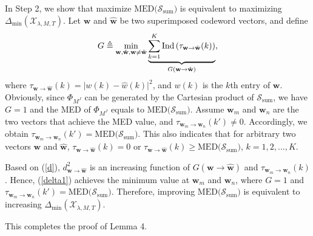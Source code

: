 \documentclass[journal]{IEEEtran}
\begin{document}
 In Step 2,  we show that maximize   $\text{MED} \big ({\boldsymbol{\mathcal S}_{\text{sum}} } \big) $ is equivalent to maximizing    $\Delta_{\min}\left( {   \boldsymbol {\mathcal X}_{\lambda,M,T}      }\right) $.  Let ${{\mathbf{w}} }$ and ${ \hat{\mathbf{w}} }$    be   two superimposed codeword vectors, and define   \begin{equation}
    \small
    \label{gg}
  G    \triangleq \underset{ {{\mathbf{w}} },  {\hat {\mathbf{w}} },   {{\mathbf{w}} } \neq  {\hat {\mathbf{w}} }
  }{\min}  \underbrace{\sum \limits _{k=1}^{K}\text {Ind}\left (\tau _{{{\mathbf{w}} } \rightarrow {\hat {\mathbf{w}} }}(k)\right)  }_{G({{{\mathbf{w}} } \rightarrow {\hat {\mathbf{w}} }})}, 
  \end{equation} 
  where $\tau _{{{\mathbf{w}} } \rightarrow { \hat{\mathbf{w}} }}(k) = \vert w(k) - \hat w(k) \vert^2 $, and $w(k)$ is  the $k$th entry of $\mathbf w$.  Obviously, since $\Phi_{M^J}$ can be  generated by the Cartesian product of $\boldsymbol{\mathcal S}_{\text{sum}}$,  we have  $ G =1$ and the MED of $\Phi_{M^J}$   equals to $\text{MED} \big ({\boldsymbol{\mathcal S}_{\text{sum}} } \big) $. Assume ${{\mathbf{w}}_m }$ and ${ {\mathbf{w}}_n }$ are the two vectors that achieve  the MED value, and $\tau _{{{\mathbf{w}}_m } \rightarrow { {\mathbf{w}_n} }}(k') \neq 0$. Accordingly, we obtain $\tau _{{{\mathbf{w}}_m } \rightarrow { {\mathbf{w}_n} }}(k') = \text{MED} \big ({\boldsymbol{\mathcal S}_{\text{sum}} } \big)$. This also indicates that for  arbitrary two vectors ${{\mathbf{w}} }$ and ${ \hat{\mathbf{w}} }$,    $\tau _{{{\mathbf{w}} } \rightarrow {\hat {\mathbf{w}} }}(k) = 0$ or $\tau _{{{\mathbf{w}} } \rightarrow {\hat {\mathbf{w}} }}(k) \geq \text{MED} \big ({\boldsymbol{\mathcal S}_{\text{sum}} } \big)$, $k =1, 2, \ldots, K$.
  
  
  Based on (\ref{d}), $d_{ \mathbf{w} \to \mathbf{\hat{w}} }^2 $ is an increasing function of ${G({{{\mathbf{w}} } \rightarrow {\hat {\mathbf{w}} }})}$ and $\tau _{{{\mathbf{w}}_m } \rightarrow { {\mathbf{w}_n} }}(k)$. Hence,   (\ref{delta1}) achieves the minimum value at  ${{\mathbf{w}}_m }$ and ${ {\mathbf{w}}_n }$, where $G=1$ and $\tau _{{{\mathbf{w}}_m } \rightarrow { {\mathbf{w}_n} }}(k') = \text{MED} \big ({\boldsymbol{\mathcal S}_{\text{sum}} } \big)$. Therefore, improving $\text{MED} \big ({\boldsymbol{\mathcal S}_{\text{sum}} } \big)$ is equivalent to  increasing  $\Delta_{\min}\left( {   \boldsymbol {\mathcal X}_{\lambda,M,T}      }\right) $.
  
  This completes the proof of Lemma 4.
  \label{AppeD}
\end{document}
